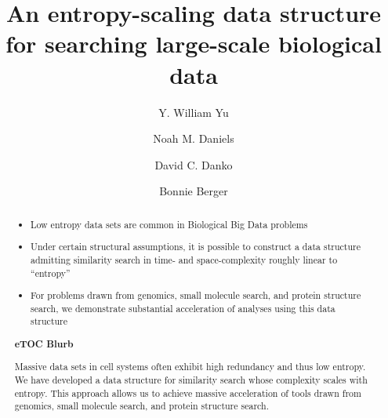 \documentclass[review,preprint,12pt]{elsarticle}
\theoremstyle{definition}
\theoremstyle{remark}
\numberwithin{equation}{section}
\begin{document}
\begin{frontmatter}

\title{ %
An entropy-scaling data structure for searching large-scale biological data}

\author[mitmath,mitcsail]{Y. William Yu}
\author[mitmath,mitcsail]{Noah M. Daniels}
\author[mitcsail]{David C. Danko}
\author[mitmath,mitcsail]{Bonnie Berger}
\address[mitmath]{Department of Mathematics, Massachusetts Institute of Technology, Cambridge, Massachusetts 02139}
\address[mitcsail]{Computer Science and AI Lab, Massachusetts Institute of Technology, Cambridge, Massachusetts 02139}






\begin{abstract}
    \begin{itemize}
        \item Low entropy data sets are common in Biological Big Data problems
        \item Under certain structural assumptions, it is possible to construct a data structure admitting similarity search in time- and space-complexity roughly linear to ``entropy''
        \item For problems drawn from genomics, small molecule search, and protein structure search, we demonstrate substantial acceleration of analyses using this data structure
    \end{itemize}
\noindent\unskip\textbf{eTOC Blurb}
\par\medskip\noindent\unskip\ignorespaces
Massive data sets in cell systems often exhibit high redundancy and thus low entropy.
We have developed a data structure for similarity search whose complexity scales with entropy.
This approach allows us to achieve massive acceleration of tools drawn from genomics, small molecule search, and protein structure search.
\end{abstract}

\end{frontmatter}
\end{document}
